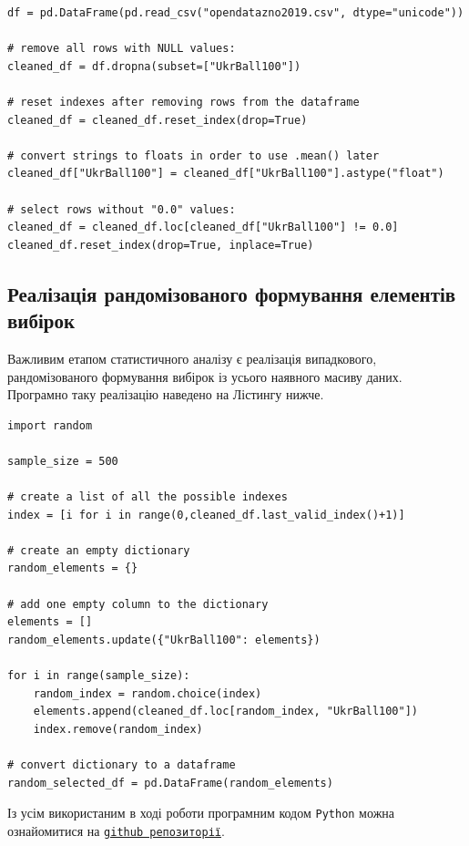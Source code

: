 \begin{lstlisting}[firstnumber=36, label = code: cleaning data, caption = Чистка даних]
df = pd.DataFrame(pd.read_csv("opendatazno2019.csv", dtype="unicode"))

# remove all rows with NULL values:
cleaned_df = df.dropna(subset=["UkrBall100"])

# reset indexes after removing rows from the dataframe
cleaned_df = cleaned_df.reset_index(drop=True)

# convert strings to floats in order to use .mean() later
cleaned_df["UkrBall100"] = cleaned_df["UkrBall100"].astype("float") 

# select rows without "0.0" values:
cleaned_df = cleaned_df.loc[cleaned_df["UkrBall100"] != 0.0]
cleaned_df.reset_index(drop=True, inplace=True)
\end{lstlisting}

\subsection*{Реалізація рандомізованого формування елементів вибірок}

Важливим етапом статистичного аналізу є реалізація випадкового, рандомізованого формування вибірок із усього 
наявного масиву даних. Програмно таку реалізацію наведено на Лістингу нижче.

\begin{lstlisting}[firstnumber=51, label = code: randomization, caption = Рандомізоване формування вибірок]
import random

sample_size = 500

# create a list of all the possible indexes
index = [i for i in range(0,cleaned_df.last_valid_index()+1)]

# create an empty dictionary
random_elements = {}

# add one empty column to the dictionary
elements = []
random_elements.update({"UkrBall100": elements})

for i in range(sample_size):
    random_index = random.choice(index)
    elements.append(cleaned_df.loc[random_index, "UkrBall100"])
    index.remove(random_index)

# convert dictionary to a dataframe
random_selected_df = pd.DataFrame(random_elements)
\end{lstlisting}

\vspace{0.4cm}
Із усім використаним в ході роботи програмним кодом \texttt{Python} можна ознайомитися на  
\href{https://github.com/Arroneq/SA-PYTHON.git}{\texttt{github репозиторії}}.
